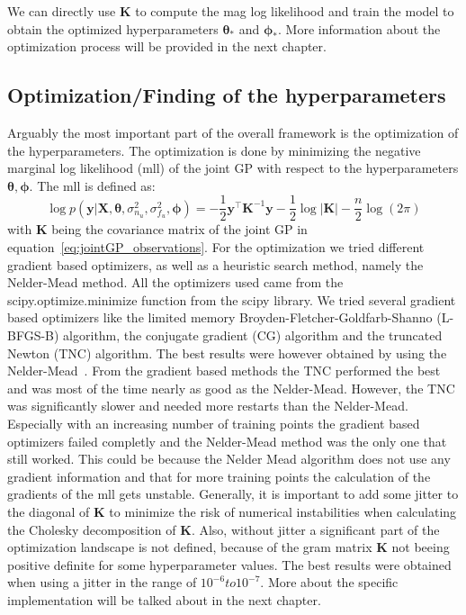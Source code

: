 \documentclass{article}
\begin{document}
We can directly use $\bm{K}$ to compute the mag log likelihood and train the
model to obtain the optimized hyperparameters $\bm{\theta_*}$ and
$\bm{\phi_*}$. More information about the optimization process will be provided
in the next chapter.

\subsection{Optimization/Finding of the hyperparameters}
Arguably the most important part of the overall framework is the optimization of the hyperparameters. The optimization is done by minimizing the negative marginal log likelihood (mll) of the joint GP with respect to the hyperparameters $\bm{\theta, \phi}$. The mll is defined as:
\begin{equation}
    \label{eq:mll}
    \log p(\bm{y}|\bm{X},\bm{\theta},\sigma_{n_u}^2,\sigma_{f_u}^2,\bm{\phi}) =
    -\frac{1}{2}\bm{y}^\intercal \bm{K}^{-1}\bm{y} - \frac{1}{2}\log\left\lvert \bm{K}\right\rvert - \frac{n}{2}\log(2\pi)
\end{equation}
with $\bm{K}$ being the covariance matrix of the joint GP in equation~\ref{eq:jointGP_observations}. For the optimization we tried different gradient based optimizers, as well as a heuristic search method, namely the Nelder-Mead method. All the optimizers used came from the scipy.optimize.minimize function from the scipy library. We tried several gradient based optimizers like the limited memory Broyden-Fletcher-Goldfarb-Shanno (L-BFGS-B) algorithm, the conjugate gradient (CG) algorithm and the truncated Newton (TNC) algorithm. The best results were however obtained by using the Nelder-Mead~\cite{Singer:2009NelderMead}. From the gradient based methods the TNC performed the best and was most of the time nearly as good as the Nelder-Mead. However, the TNC was significantly slower and needed more restarts than the Nelder-Mead. Especially with an increasing number of training points the gradient based optimizers failed completly and the Nelder-Mead method was the only one that still worked. This could be because the Nelder Mead algorithm does not use any gradient information and that for more training points the calculation of the gradients of the mll gets unstable. Generally, it is important to add some jitter to the diagonal of $\bm{K}$ to minimize the risk of numerical instabilities when calculating the Cholesky decomposition of $\bm{K}$. Also, without jitter a significant part of the optimization landscape is not defined, because of the  gram matrix $\bm{K}$ not beeing positive definite for some hyperparameter values. The best results were obtained when using a jitter in the range of $10^{-6} to 10^{-7}$. More about the specific implementation will be talked about in the next chapter.\\
\end{document}
